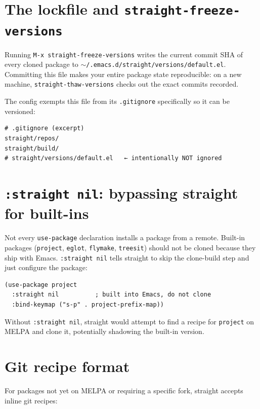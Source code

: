 \section{The lockfile and \texttt{straight-freeze-versions}}\label{the-lockfile-and-straight-freeze-versions}

Running \texttt{M-x straight-freeze-versions} writes the current commit SHA of every cloned package to \texttt{$\sim$/.emacs.d/straight/versions/default.el}. Committing this file makes your entire package state reproducible: on a new machine, \texttt{straight-thaw-versions} checks out the exact commits recorded.

The config exempts this file from its \texttt{.gitignore} specifically so it can be versioned:

\begin{verbatim}
# .gitignore (excerpt)
straight/repos/
straight/build/
# straight/versions/default.el   ← intentionally NOT ignored
\end{verbatim}

\section{\texttt{:straight nil}: bypassing straight for built-ins}\label{straight-nil-bypassing-straight-for-built-ins}

Not every \texttt{use-package} declaration installs a package from a remote. Built-in packages (\texttt{project}, \texttt{eglot}, \texttt{flymake}, \texttt{treesit}) should not be cloned because they ship with Emacs. \texttt{:straight nil} tells straight to skip the clone-build step and just configure the package:

\begin{verbatim}
(use-package project
  :straight nil          ; built into Emacs, do not clone
  :bind-keymap ("s-p" . project-prefix-map))
\end{verbatim}

Without \texttt{:straight nil}, straight would attempt to find a recipe for \texttt{project} on MELPA and clone it, potentially shadowing the built-in version.

\section{Git recipe format}\label{git-recipe-format}

For packages not yet on MELPA or requiring a specific fork, straight accepts inline git recipes:


